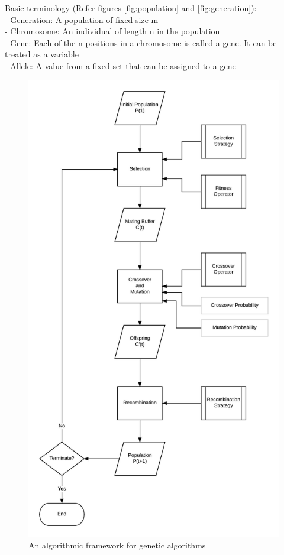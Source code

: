 \documentclass[12pt,a4paper]{article}
\begin{document}
	Basic terminology (Refer figures \ref{fig:population} and \ref{fig:generation}): \\
	- Generation: A population of fixed size m \\
	- Chromosome: An individual of length n in the population \\
	- Gene: Each of the n positions in a chromosome is called a gene. It can be treated as a variable \\
	- Allele: A value from a fixed set that can be assigned to a gene\par

	\begin{figure}[H]
		\includegraphics[width=\textwidth,height=\textheight]{"GA-block1"}
		\caption{An algorithmic framework for genetic algorithms}
		\centering
		\label{fig:framework}
	\end{figure}
	
\end{document}
